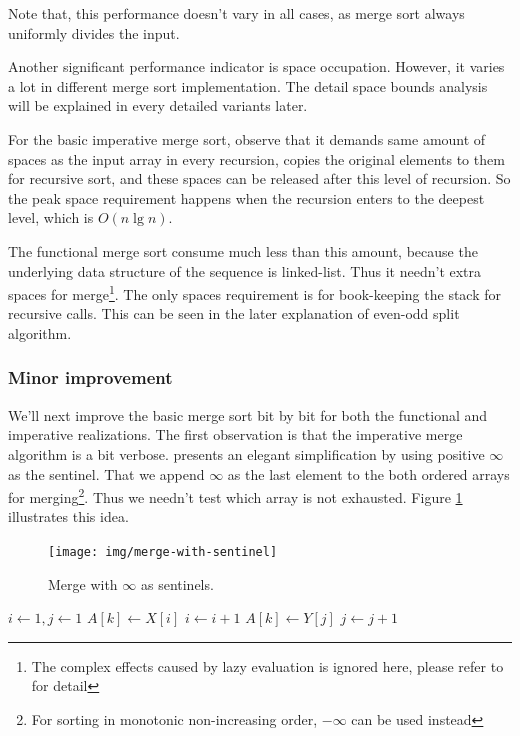 \documentclass[b5paper]{article}
\begin{document}
Note that, this performance doesn't vary in all cases, as merge sort always uniformly divides the input.

Another significant performance indicator is space occupation. However, it varies a lot in different
merge sort implementation. The detail space bounds analysis will be explained in every detailed variants
later.

For the basic imperative merge sort, observe that it demands same amount of spaces as the input array
in every recursion, copies the original elements to them for recursive sort, and these spaces can
be released after this level of recursion. So the peak space requirement happens when the recursion
enters to the deepest level, which is $O(n \lg n)$.

The functional merge sort consume much less than this amount, because the underlying data structure
of the sequence is linked-list. Thus it needn't extra spaces for merge\footnote{The complex effects
caused by lazy evaluation is ignored here, please refer to \cite{algo-fp} for detail}.
The only spaces requirement is for book-keeping the stack for recursive calls. This can be
seen in the later explanation of even-odd split algorithm.

\subsubsection{Minor improvement}
We'll next improve the basic merge sort bit by bit for both the functional and imperative realizations.
The first observation is that the imperative merge algorithm is a bit verbose. \cite{CLRS} presents
an elegant simplification by using positive $\infty$ as the sentinel. That we append $\infty$ as
the last element to the both ordered arrays for merging\footnote{For sorting in monotonic non-increasing order,
$-\infty$ can be used instead}. Thus we needn't test which array is not exhausted. Figure \ref{fig:merge-with-sentinel}
illustrates this idea.

\begin{figure}[htbp]
 \centering
 \texttt{[image: img/merge-with-sentinel]}
 \caption{Merge with $\infty$ as sentinels.}
 \label{fig:merge-with-sentinel}
\end{figure}

\begin{algorithmic}[1]
  \State {}
  \State {}
  \State $i \gets 1, j\gets 1$
      \State $A[k] \gets X[i]$
      \State $i \gets i + 1$
    \Else
      \State $A[k] \gets Y[j]$
      \State $j \gets j + 1$
    \EndIf
  \EndFor
\EndProcedure
\end{algorithmic}
\end{document}

